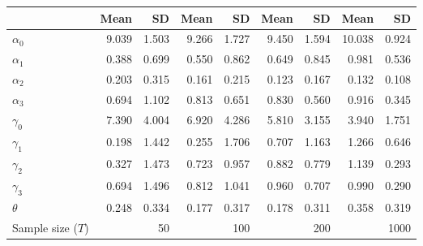 
\begin{tabular}[t]{lrrrrrrrr}
\toprule
  & Mean & SD & Mean  & SD  & Mean   & SD   & Mean    & SD   \\
\midrule
$\alpha_{0}$ & 9.039 & 1.503 & 9.266 & 1.727 & 9.450 & 1.594 & 10.038 & 0.924\\
$\alpha_{1}$ & 0.388 & 0.699 & 0.550 & 0.862 & 0.649 & 0.845 & 0.981 & 0.536\\
$\alpha_{2}$ & 0.203 & 0.315 & 0.161 & 0.215 & 0.123 & 0.167 & 0.132 & 0.108\\
$\alpha_{3}$ & 0.694 & 1.102 & 0.813 & 0.651 & 0.830 & 0.560 & 0.916 & 0.345\\
$\gamma_{0}$ & 7.390 & 4.004 & 6.920 & 4.286 & 5.810 & 3.155 & 3.940 & 1.751\\
$\gamma_{1}$ & 0.198 & 1.442 & 0.255 & 1.706 & 0.707 & 1.163 & 1.266 & 0.646\\
$\gamma_{2}$ & 0.327 & 1.473 & 0.723 & 0.957 & 0.882 & 0.779 & 1.139 & 0.293\\
$\gamma_{3}$ & 0.694 & 1.496 & 0.812 & 1.041 & 0.960 & 0.707 & 0.990 & 0.290\\
$\theta$ & 0.248 & 0.334 & 0.177 & 0.317 & 0.178 & 0.311 & 0.358 & 0.319\\
Sample size ($T$) &  & 50 &  & 100 &  & 200 &  & 1000\\
\bottomrule
\end{tabular}
